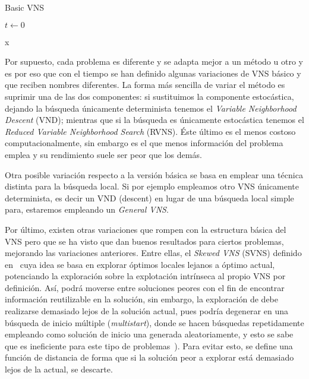\begin{algorithm}[htbp]
	\caption{Basic VNS~\cite{vns}}
	\label{algoritmo:Basic-VNS}
	
	\DontPrintSemicolon

	\bigskip
	
	$t \leftarrow 0$ \;
	
	
	\Return x \;
	
\end{algorithm}

Por supuesto, cada problema es diferente y se adapta mejor a un método u otro y es por eso que con el tiempo se han definido algunas variaciones de VNS básico y que reciben nombres diferentes. La forma más sencilla de variar el método es suprimir una de las dos componentes: si sustituimos la componente estocástica, dejando la búsqueda únicamente determinista tenemos el \textit{Variable Neighborhood Descent} (VND); mientras que si la búsqueda es únicamente estocástica tenemos el \textit{Reduced Variable Neighborhood Search} (RVNS). Éste último es el menos costoso computacionalmente, sin embargo es el que menos información del problema emplea y su rendimiento suele ser peor que los demás.

Otra posible variación respecto a la versión básica se basa en emplear una técnica distinta para la búsqueda local. Si por ejemplo empleamos otro VNS únicamente determinista, es decir un VND (descent) en lugar de una búsqueda local simple para, estaremos empleando un \textit{General VNS}.

Por último, existen otras variaciones que rompen con la estructura básica del VNS pero que se ha visto que dan buenos resultados para ciertos problemas, mejorando las variaciones anteriores. Entre ellas, el \textit{Skewed VNS} (SVNS) definido en~\cite{svns-def} cuya idea se basa en explorar óptimos locales lejanos a óptimo actual, potenciando la exploración sobre la explotación intrínseca al propio VNS por definición. Así, podrá moverse entre soluciones peores con el fin de encontrar información reutilizable en la solución, sin embargo, la exploración de debe realizarse demasiado lejos de la solución actual, pues podría degenerar en una búsqueda de inicio múltiple (\textit{multistart}), donde se hacen búsquedas repetidamente empleando como solución de inicio una generada aleatoriamente, y esto se sabe que es ineficiente para este tipo de problemas~\cite{vns}). Para evitar esto, se define una función de distancia de forma que si la solución peor a explorar está demasiado lejos de la actual, se descarte.

